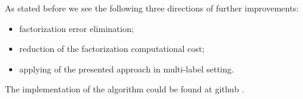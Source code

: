 \documentclass{article}
\begin{document}
As stated before we see the following three directions of further improvements:
\begin{itemize}
	\item factorization error elimination;
	\item reduction of the factorization computational cost;
	\item applying of the presented approach in multi-label setting.
\end{itemize}
The implementation of the algorithm could be found at github \cite{github}.
\end{document}
